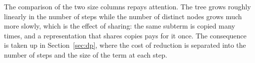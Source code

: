 \begin{center}
\tableGrowth
\end{center}

The comparison of the two size columns repays attention. The tree grows roughly linearly in the number of steps while the number of distinct nodes grows much more slowly, which is the effect of sharing: the same subterm is copied many times, and a representation that shares copies pays for it once. The consequence is taken up in Section~\ref{sec:dp}, where the cost of reduction is separated into the number of steps and the size of the term at each step.
